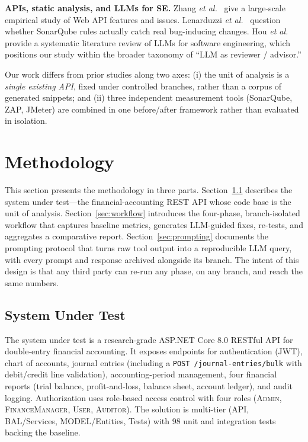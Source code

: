 \documentclass[conference]{IEEEtran}
\begin{document}
\textbf{APIs, static analysis, and LLMs for SE.} Zhang \textit{et al.}~\cite{ref5} give a large-scale empirical study of Web API features and issues. Lenarduzzi \textit{et al.}~\cite{ref15} question whether SonarQube rules actually catch real bug-inducing changes. Hou \textit{et al.}~\cite{ref14} provide a systematic literature review of LLMs for software engineering, which positions our study within the broader taxonomy of ``LLM as reviewer / advisor.''

Our work differs from prior studies along two axes: (i) the unit of analysis is a \emph{single existing API}, fixed under controlled branches, rather than a corpus of generated snippets; and (ii) three independent measurement tools (SonarQube, ZAP, JMeter) are combined in one before/after framework rather than evaluated in isolation.

\section{Methodology}
This section presents the methodology in three parts. Section~\ref{sec:sut} describes the system under test---the financial-accounting REST API whose code base is the unit of analysis. Section~\ref{sec:workflow} introduces the four-phase, branch-isolated workflow that captures baseline metrics, generates LLM-guided fixes, re-tests, and aggregates a comparative report. Section~\ref{sec:prompting} documents the prompting protocol that turns raw tool output into a reproducible LLM query, with every prompt and response archived alongside its branch. The intent of this design is that any third party can re-run any phase, on any branch, and reach the same numbers.

\subsection{System Under Test}\label{sec:sut}
The system under test is a research-grade ASP.NET Core 8.0 RESTful API for double-entry financial accounting. It exposes endpoints for authentication (JWT), chart of accounts, journal entries (including a \texttt{POST /journal-entries/bulk} with debit/credit line validation), accounting-period management, four financial reports (trial balance, profit-and-loss, balance sheet, account ledger), and audit logging. Authorization uses role-based access control with four roles (\textsc{Admin}, \textsc{FinanceManager}, \textsc{User}, \textsc{Auditor}). The solution is multi-tier (API, BAL/Services, MODEL/Entities, Tests) with 98 unit and integration tests backing the baseline.
\end{document}
